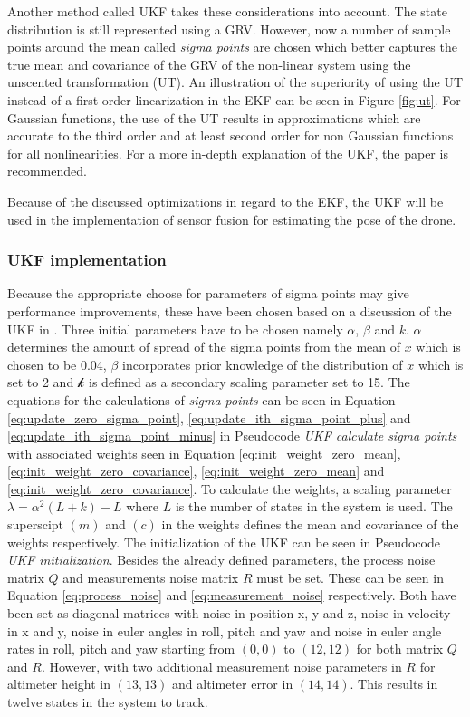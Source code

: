 \documentclass[../Head/report.tex]{subfiles}
\begin{document}
Another method called UKF takes these considerations into account. The state distribution is still represented using a GRV. However, now a number of sample points around the mean called \textit{sigma points} are chosen which better captures the true mean and covariance of the GRV of the non-linear system using the unscented transformation (UT). An illustration of the superiority of using the UT instead of a first-order linearization in the EKF can be seen in Figure \ref{fig:ut}. For Gaussian functions, the use of the UT results in approximations which are accurate to the third order and at least second order for non Gaussian functions for all nonlinearities. For a more in-depth explanation of the UKF, the paper \cite{UnscentedKalmanFilter} is recommended.  

Because of the discussed optimizations in regard to the EKF, the UKF will be used in the implementation of sensor fusion for estimating the pose of the drone. 

\subsubsection{UKF implementation}
\label{sec:ukf_implementation}

Because the appropriate choose for parameters of sigma points may give performance improvements, these have been chosen based on a discussion of the UKF in \cite[p.~354]{KalmanAndBayesianFiltersInPython}. Three initial parameters have to be chosen namely $\alpha$, $\beta$ and $k$. $\alpha$ determines the amount of spread of the sigma points from the mean of $\bar{x}$ which is chosen to be 0.04, $\beta$ incorporates prior knowledge of the distribution of $x$ which is set to 2 and $\mathcal{k}$ is defined as a secondary scaling parameter set to 15. The equations for the calculations of \textit{sigma points} can be seen in Equation \ref{eq:update_zero_sigma_point}, \ref{eq:update_ith_sigma_point_plus} and \ref{eq:update_ith_sigma_point_minus} in Pseudocode \textit{UKF calculate sigma points} with associated weights seen in Equation \ref{eq:init_weight_zero_mean}, \ref{eq:init_weight_zero_covariance}, \ref{eq:init_weight_zero_mean} and \ref{eq:init_weight_zero_covariance}. To calculate the weights, a scaling parameter $\lambda = \alpha^2(L+k)-L$ where $L$ is the number of states in the system is used. The superscipt $(m)$ and $(c)$ in the weights defines the mean and covariance of the weights respectively. The initialization of the UKF can be seen in Pseudocode \textit{UKF initialization}. Besides the already defined parameters, the process noise matrix $Q$ and measurements noise matrix $R$ must be set. These can be seen in Equation \ref{eq:process_noise} and \ref{eq:measurement_noise} respectively. Both have been set as diagonal matrices with noise in position x, y and z, noise in velocity in x and y, noise in euler angles in roll, pitch and yaw and noise in euler angle rates in roll, pitch and yaw starting from $(0,0)$ to $(12,12)$ for both matrix $Q$ and $R$. However, with two additional measurement noise parameters in $R$ for altimeter height in $(13,13)$ and altimeter error in $(14,14)$. This results in twelve states in the system to track.
\end{document}
